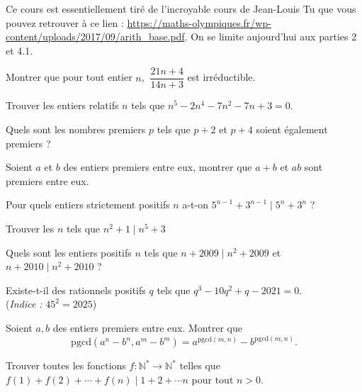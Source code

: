Ce cours est essentiellement tiré de l'incroyable cours de Jean-Louis Tu que vous pouvez retrouver à ce lien : \url{https://maths-olympiques.fr/wp-content/uploads/2017/09/arith_base.pdf}. On se limite aujourd'hui aux parties 2 et 4.1.\newline\newline




\begin{exo}
Montrer que pour tout entier $n$, $\:\dfrac{21n+4}{14n+3}$ est irréductible.
\end{exo}
\begin{exo}
Trouver les entiers relatifs $n$ tels que $n^5-2n^4-7n^2-7n+3=0$.
\end{exo}
\begin{exo}
Quels sont les nombres premiers $p$ tels que $p+2$ et $p+4$ soient également premiers ?
\end{exo}
\begin{exo}
Soient $a$ et $b$ des entiers premiers entre eux, montrer que $a+b$ et $ab$ sont premiers entre eux.
\end{exo}
\begin{exo}
Pour quels entiers strictement positifs $n$ a-t-on $5^{n-1}+3^{n-1}\mid 5^n+3^n$ ?
\end{exo}
\begin{exo}
Trouver les $n$ tels que $n^2+1\mid n^5+3$
\end{exo}
\begin{exo}
Quels sont les entiers positifs $n$ tels que $n+2009\mid n^2+2009$ et $n+2010\mid n^2+2010$ ?
\end{exo}
\begin{exo}
Existe-t-il des rationnels positifs $q$ tels que $q^3-10q^2+q-2021=0.$ \\(\emph{Indice :} $45^2=2025$)
\end{exo}
\begin{exo}
Soient $a,b$ des entiers premiers entre eux.
Montrer que $$\mathrm{pgcd}(a^n-b^n,a^m-b^m)=a^{\mathrm{pgcd}(m,n)}-b^{\mathrm{pgcd}(m,n)}.$$
\end{exo}
\begin{exo}
Trouver toutes les fonctions $f:\mathbb N^*\rightarrow\mathbb N^*$ telles que $f(1)+f(2)+\cdots+f(n)\mid 1+2+\cdots n$ pour tout $n>0.$
\end{exo}

